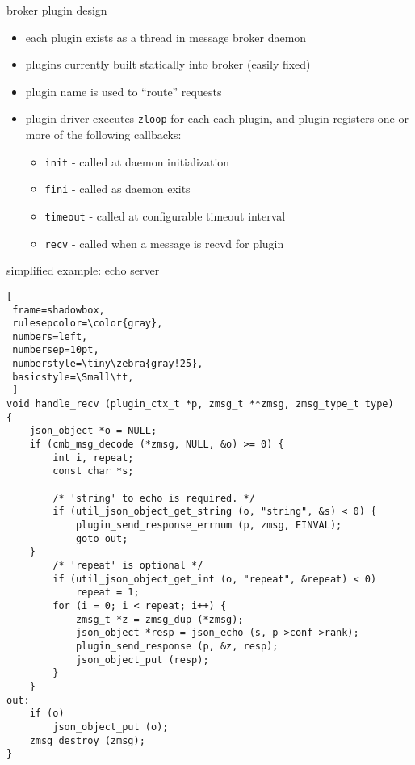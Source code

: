 \documentclass[default,pdf,colorBG,slideColor]{prosper}
\makeatletter
\newcommand\Small{\fontsize{6}{6.2}\selectfont}
\newcommand\realnumberstyle[1]{}
\newcommand{\zebra}[2]{%
    {\realnumberstyle{#2}}%
    \begingroup
    \lst@basicstyle
    \ifodd\value{lstnumber}%
        \color{#1}%
        \rlap{\hspace*{\lst@numbersep}%
        \color@block{\linewidth}{\ht\strutbox}{\dp\strutbox}%
        }%
    \fi
    \endgroup
}
\makeatother
\begin{document}
\begin{slide}{broker plugin design}{\small
\begin{itemize}
 \item{each plugin exists as a thread in message broker daemon}
 \item{plugins currently built statically into broker (easily fixed) }
 \item{plugin name is used to ``route'' requests}
 \item{plugin driver executes {\tt zloop} for each each plugin, and plugin
        registers one or more of the following callbacks:}
 \begin{itemize}
   \item{{\tt init} - called at daemon initialization}
   \item{{\tt fini} - called as daemon exits}
   \item{{\tt timeout} - called at configurable timeout interval}
   \item{{\tt recv} - called when a message is recvd for plugin}
 \end{itemize}
\end{itemize}
}\end{slide}

\begin{slide}{simplified example: echo server}
{\tiny\bf
\begin{lstlisting}[
 frame=shadowbox,
 rulesepcolor=\color{gray},
 numbers=left,
 numbersep=10pt,
 numberstyle=\tiny\zebra{gray!25},
 basicstyle=\Small\tt,
 ]
void handle_recv (plugin_ctx_t *p, zmsg_t **zmsg, zmsg_type_t type)
{
    json_object *o = NULL;
    if (cmb_msg_decode (*zmsg, NULL, &o) >= 0) {
        int i, repeat;
        const char *s;

        /* 'string' to echo is required. */
        if (util_json_object_get_string (o, "string", &s) < 0) {
            plugin_send_response_errnum (p, zmsg, EINVAL);
            goto out;
	}
        /* 'repeat' is optional */
        if (util_json_object_get_int (o, "repeat", &repeat) < 0)
            repeat = 1;
        for (i = 0; i < repeat; i++) {
            zmsg_t *z = zmsg_dup (*zmsg);
            json_object *resp = json_echo (s, p->conf->rank);
            plugin_send_response (p, &z, resp);
            json_object_put (resp);
        }
    }
out:
    if (o)
        json_object_put (o);
    zmsg_destroy (zmsg);
}
\end{lstlisting}
} \end{slide}
\end{document}
